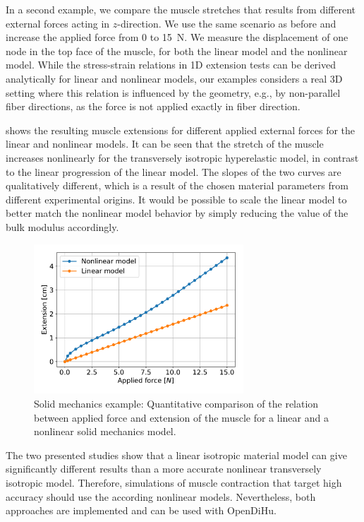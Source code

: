 In a second example, we compare the muscle stretches that results from different external forces acting in $z$-direction.  We use the same scenario as before and increase the applied force from 0 to \SI{15}{\newton}. We measure the displacement of one node in the top face of the muscle, for both the linear model and the nonlinear model. While the stress-strain relations  in 1D extension tests  can be derived analytically for linear and nonlinear models, our examples considers a real 3D setting where this relation is influenced by the geometry, e.g., by non-parallel fiber directions, as the force is not applied exactly in fiber direction.

 shows the resulting muscle extensions for different applied external forces for the linear and nonlinear models.
It can be seen that the stretch of the muscle increases nonlinearly for the transversely isotropic hyperelastic model, in contrast to the linear progression of the linear model.
The slopes of the two curves are qualitatively different, which is a result of the chosen material parameters from different experimental origins. It would be possible to scale the linear model to better match the nonlinear model behavior by simply reducing the value of the bulk modulus accordingly.

\begin{figure}
  \centering%
  \includegraphics[width=0.7\textwidth]{images/results/basic/linear_nonlinear_displacements.pdf}%
  \caption{Solid mechanics example: Quantitative comparison of the relation between applied force and extension of the muscle for a linear and a nonlinear solid mechanics model.}%
  \label{fig:linear_nonlinear_displacements}%
\end{figure}

The two presented studies show that a linear isotropic material model can give significantly different results than a more accurate nonlinear transversely isotropic model. Therefore, simulations of muscle contraction that target high accuracy should use the according nonlinear models. Nevertheless, both approaches are implemented and can be used with OpenDiHu.

